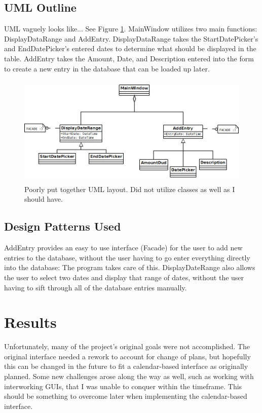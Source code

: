 \documentclass[10pt,conference,onecolumn,compsoc]{IEEEtran}
\begin{document}
\subsection{UML Outline}
UML vaguely looks like... See Figure \ref{UML}. MainWindow utilizes two main functions: DisplayDataRange and AddEntry. DisplayDataRange takes the StartDatePicker's and EndDatePicker's entered dates to determine what should be displayed in the table. AddEntry takes the Amount, Date, and Description entered into the form to create a new entry in the database that can be loaded up later.

\begin{figure}[ht!]
\includegraphics[height=200px, width=500px]{FinancialDMDiagram.jpg}
\caption{Poorly put together UML layout. Did not utilize classes as well as I should have.}
\label{UML}
\end{figure}


\subsection{Design Patterns Used}
AddEntry provides an easy to use interface (Facade) for the user to add new entries to the database, without the user having to go enter everything directly into the database: The program takes care of this.
DisplayDateRange also allows the user to select two dates and display that range of dates, without the user having to sift through all of the database entries manually.

\section{Results}
Unfortunately, many of the project's original goals were not accomplished. The original interface needed a rework to account for change of plans, but hopefully this can be changed in the future to fit a calendar-based interface as originally planned. Some new challenges arose along the way as well, such as working with interworking GUIs, that I was unable to conquer within the timeframe. This should be something to overcome later when implementing the calendar-based interface.
\end{document}
